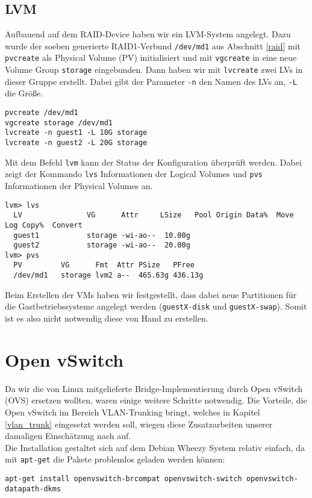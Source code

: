 \section{LVM}
\label{lvm}
Aufbauend auf dem RAID-Device haben wir ein LVM-System angelegt. Dazu wurde der soeben generierte RAID1-Verbund \verb#/dev/md1# aus Abschnitt \ref{raid} mit \verb#pvcreate# als Physical Volume (PV) initialisiert und mit \verb#vgcreate# in eine neue Volume Group \verb#storage# eingebunden. 
Dann haben wir mit \verb#lvcreate# zwei LVs in dieser Gruppe erstellt. Dabei gibt der Parameter \verb#-n# den Namen des LVs an, \verb#-L# die Größe. 
\begin{verbatim}
pvcreate /dev/md1 
vgcreate storage /dev/md1
lvcreate -n guest1 -L 10G storage
lvcreate -n guest2 -L 20G storage
\end{verbatim} 
Mit dem Befehl \verb#lvm# kann der Status der Konfiguration überprüft werden. Dabei zeigt der Kommando \verb#lvs# Informationen der Logical Volumes und \verb#pvs# Informationen der Physical Volumes an. 
\setupVerbatimOut
{}
\begin{verbatim}
lvm> lvs
  LV               VG      Attr     LSize   Pool Origin Data%  Move Log Copy%  Convert                                        
  guest1           storage -wi-ao--  10.00g                                           
  guest2           storage -wi-ao--  20.00g                                           
lvm> pvs
  PV         VG      Fmt  Attr PSize   PFree  
  /dev/md1   storage lvm2 a--  465.63g 436.13g
\end{verbatim} 
Beim Erstellen der VMs haben wir festgestellt, dass dabei neue Partitionen für die Gastbetriebssysteme angelegt werden (\verb#guestX-disk# und \verb#guestX-swap#). Somit ist es also nicht notwendig diese von Hand zu erstellen. 

\chapter{Open vSwitch}
\label{chap:ovs}
Da wir die von Linux mitgelieferte Bridge-Implementierung durch Open vSwitch (OVS) ersetzen wollten, waren einige weitere Schritte notwendig. Die Vorteile, die Open vSwitch im Bereich VLAN-Trunking bringt, welches in Kapitel \ref{vlan_trunk} eingesetzt werden soll, wiegen diese Zusatzarbeiten unserer damaligen Einschätzung nach auf.
\\
Die Installation gestaltet sich auf dem Debian Wheezy System relativ einfach, da mit \verb#apt-get# die Pakete problemlos geladen werden können:
\begin{verbatim}
apt-get install openvswitch-brcompat openvswitch-switch openvswitch-datapath-dkms
\end{verbatim}

